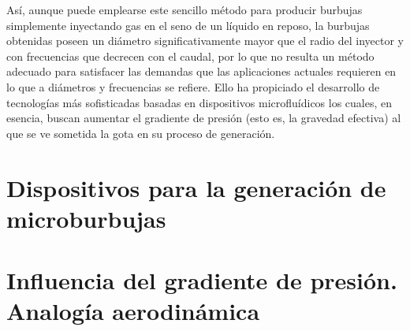Así, aunque puede emplearse este sencillo método para producir burbujas simplemente inyectando gas en el seno de un líquido en reposo, la burbujas obtenidas poseen un diámetro significativamente mayor que el radio del inyector y con frecuencias que decrecen con el caudal, por lo que no resulta un método adecuado para satisfacer las demandas que las aplicaciones actuales requieren en lo que a diámetros y frecuencias se refiere\cite{Rodriguez-Rodriguez2015b}. Ello ha propiciado el desarrollo de tecnologías más sofisticadas basadas en dispositivos microfluídicos los cuales, en esencia, buscan aumentar el gradiente de presión (esto es, la gravedad efectiva) al que se ve sometida la gota en su proceso de generación. 




\section{Dispositivos para la generación de microburbujas}

\section{Influencia del gradiente de presión. Analogía aerodinámica}
